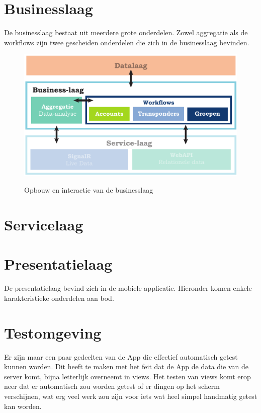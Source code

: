   

\section{Businesslaag}
  De businesslaag bestaat uit meerdere grote onderdelen. Zowel aggregatie als de workflows zijn twee gescheiden onderdelen die zich in de businesslaag bevinden.
 
\begin{figure}[ht]
  \includegraphics[width=\textwidth]{style/images/Businesslaag}      
  \label{fig:lagen-businesslaag}
  \caption{Opbouw en interactie van de businesslaag}
\end{figure}
  
  
  
  
  
\section{Servicelaag}
  
  

\section{Presentatielaag}
  De presentatielaag bevind zich in de mobiele applicatie. Hieronder komen enkele karakteristieke onderdelen aan bod.
  

\section{Testomgeving}
Er zijn maar een paar gedeelten van de App die effectief automatisch getest kunnen worden. Dit heeft te maken met het feit dat de App de data die van de server komt, bijna letterlijk overneemt in views. Het testen van views komt erop neer dat er automatisch zou worden getest of er dingen op het scherm verschijnen, wat erg veel werk zou zijn voor iets wat heel simpel handmatig getest kan worden.

